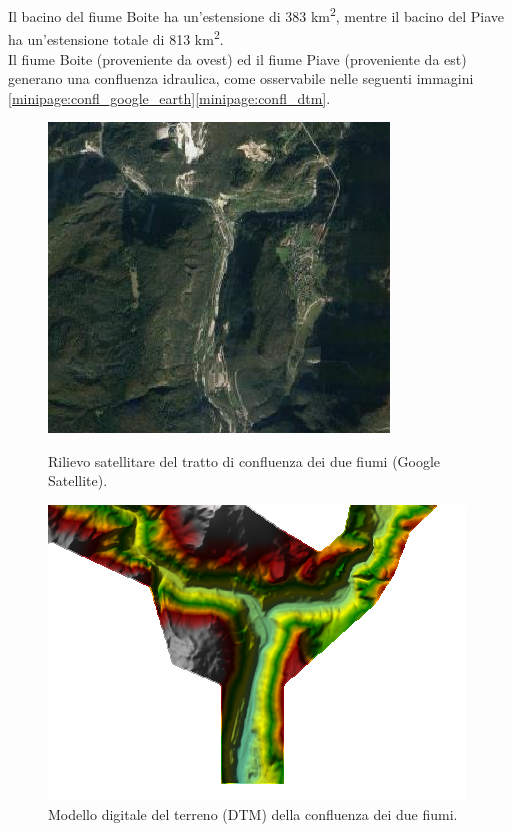 Il bacino del fiume Boite ha un'estensione di 383 \unit{km^2}, mentre il bacino del Piave ha un'estensione totale di 813 \unit{km^2}.\\
Il fiume Boite (proveniente da ovest) ed il fiume Piave (proveniente da est) generano una confluenza idraulica, come osservabile nelle seguenti immagini \eqref{minipage:confl_google_earth}\eqref{minipage:confl_dtm}.

\begin{figure}[H] \centering
    \begin{minipage}[]{7cm}
\includegraphics[scale=0.80]{immagini/confl_google_earth.PNG}
\caption{Rilievo satellitare del tratto di confluenza dei due fiumi (Google Satellite).}
\label{minipage:confl_google_earth}    
    \end{minipage}
        \hspace{2cm}
    \begin{minipage}[]{7cm}
        \includegraphics[scale=0.90]{immagini/confl_dtm.PNG}
        \caption{Modello digitale del terreno (DTM) della confluenza dei due fiumi.}
    \label{minipage:confl_dtm}
    \end{minipage} 
        \end{figure}

